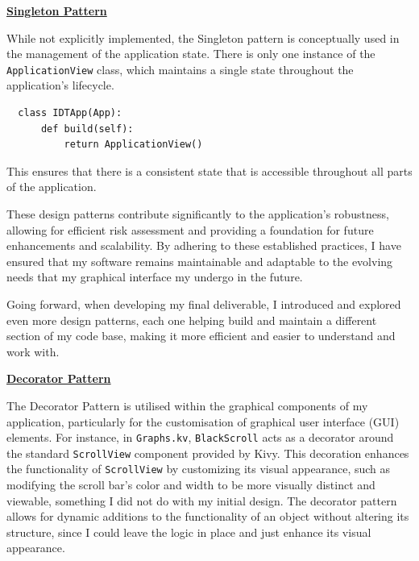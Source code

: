 \documentclass{article}
\begin{document}
\underline{\textbf{Singleton Pattern}}\\\vspace{0.3cm}

While not explicitly implemented, the Singleton pattern is conceptually used in the management of the application state. There is only one instance of the \texttt{ApplicationView} class, which maintains a single state throughout the application's lifecycle.

\begin{verbatim}
  class IDTApp(App):
      def build(self):
          return ApplicationView()
\end{verbatim}

This ensures that there is a consistent state that is accessible throughout all parts of the application.\\\vspace{0.3cm}

These design patterns contribute significantly to the application's robustness, allowing for efficient risk assessment and providing a foundation for future enhancements and scalability. By adhering to these established practices, I have ensured that my software remains maintainable and adaptable to the evolving needs that my graphical interface my undergo in the future.\\\vspace{0.3cm}

Going forward, when developing my final deliverable, I introduced and explored even more design patterns, each one helping build and maintain a different section of my code base, making it more efficient and easier to understand and work with.\\\vspace{0.3cm}

\underline{\textbf{Decorator Pattern}}\\\vspace{0.3cm}

The Decorator Pattern is utilised within the graphical components of my application, particularly for the customisation of graphical user interface (GUI) elements. For instance, in \texttt{Graphs.kv}, \texttt{BlackScroll} acts as a decorator around the standard \texttt{ScrollView} component provided by Kivy. This decoration enhances the functionality of \texttt{ScrollView} by customizing its visual appearance, such as modifying the scroll bar's color and width to be more visually distinct and viewable, something I did not do with my initial design. The decorator pattern allows for dynamic additions to the functionality of an object without altering its structure, since I could leave the logic in place and just enhance its visual appearance.
\end{document}
